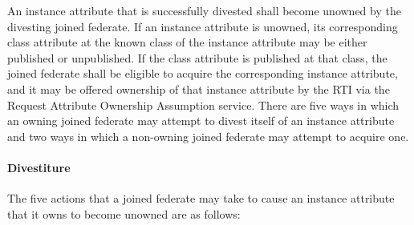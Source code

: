 \begin{compactstdpage}
    An instance attribute that is successfully divested shall become unowned by the divesting joined federate. If an instance attribute is unowned, its corresponding class attribute at the known class of the instance attribute may be either published or unpublished. If the class attribute is published at that class, the joined federate shall be eligible to acquire the corresponding instance attribute, and it may be offered ownership of that instance attribute by the RTI via the Request Attribute Ownership Assumption \rtiinitiated{} service. There are five ways in which an owning joined federate may attempt to divest itself of an instance attribute and two ways in which a non-owning joined federate may attempt to acquire one.

    \paragraph{Divestiture}


    The five actions that a joined federate may take to cause an instance attribute that it owns to become unowned are as follows:



\end{compactstdpage}

\clearpage

